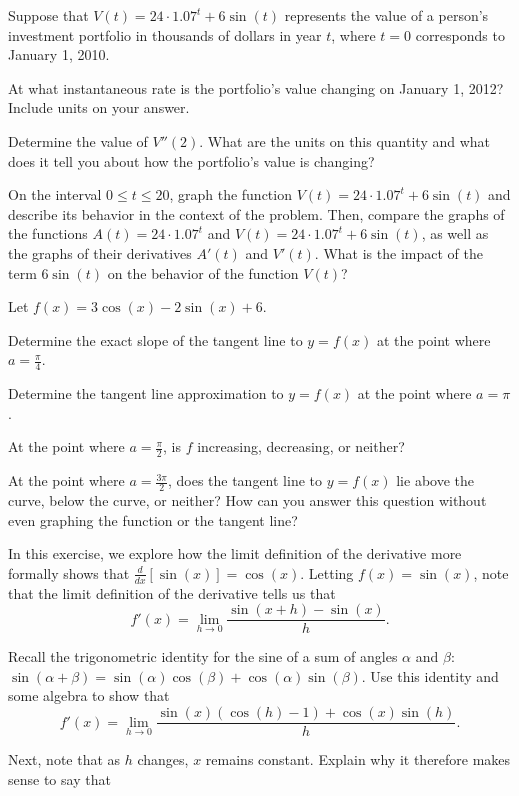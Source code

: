 \begin{exercises} 
\item Suppose that $V(t) = 24 \cdot 1.07^t + 6 \sin(t)$ represents the value of a person's investment portfolio in thousands of dollars in year $t$, where $t = 0$ corresponds to January 1, 2010.
\ba
	\item At what instantaneous rate is the portfolio's value changing on January 1, 2012?  Include units on your answer.
	\item Determine the value of $V''(2)$.  What are the units on this quantity and what does it tell you about how the portfolio's value is changing?
	\item On the interval $0 \le t \le 20$, graph the function $V(t) = 24 \cdot 1.07^t + 6 \sin(t)$ and describe its behavior in the context of the problem.  Then, compare the graphs of the functions $A(t) = 24 \cdot 1.07^t$ and $V(t) = 24 \cdot 1.07^t + 6 \sin(t)$, as well as the graphs of their derivatives $A'(t)$ and $V'(t)$.  What is the impact of the term $6 \sin(t)$ on the behavior of the function $V(t)$?
\ea
\item Let $f(x) = 3\cos(x) - 2\sin(x) + 6$.
	\ba
		\item Determine the exact slope of the tangent line to $y = f(x)$ at the point where $a = \frac{\pi}{4}$.
		\item Determine the tangent line approximation to $y = f(x)$ at the point where $a = \pi$.
		\item At the point where $a = \frac{\pi}{2}$, is $f$ increasing, decreasing, or neither?
		\item At the point where $a = \frac{3\pi}{2}$, does the tangent line to $y = f(x)$ lie above the curve, below the curve, or neither?  How can  you answer this question without even graphing the function or the tangent line?
	\ea
\item In this exercise, we explore how the limit definition of the derivative more formally shows that $\frac{d}{dx}[\sin(x)] = \cos(x)$.   Letting $f(x) = \sin(x)$, note that the limit definition of the derivative tells us that
	$$f'(x) = \lim_{h \to 0} \frac{\sin(x+h) - \sin(x)}{h}.$$
\ba
	\item Recall the trigonometric identity for the sine of a sum of angles $\alpha$ and $\beta$: \\ $\sin(\alpha + \beta) = \sin(\alpha)\cos(\beta) + \cos(\alpha)\sin(\beta)$.  Use this identity and some algebra to show that
	$$f'(x) = \lim_{h \to 0} \frac{\sin(x)(\cos(h)-1) + \cos(x)\sin(h)}{h}.$$
	\item Next, note that as $h$ changes, $x$ remains constant. Explain why it therefore makes sense to say that

\end{exercises}
